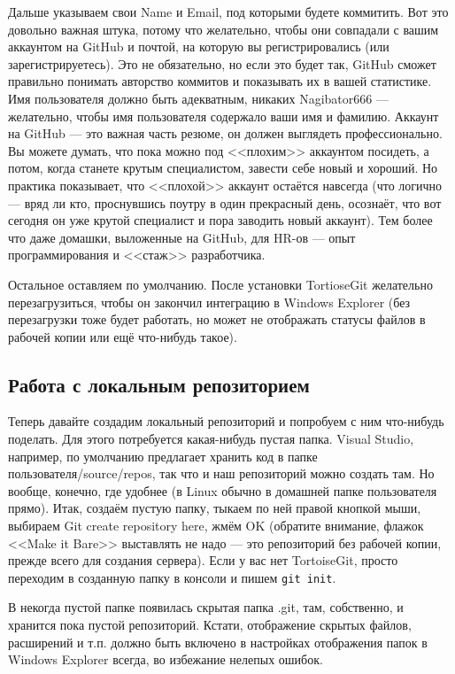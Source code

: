 \documentclass{../text-style}
\begin{document}
Дальше указываем свои Name и Email, под которыми будете коммитить. Вот это довольно важная штука, потому что желательно, чтобы они совпадали с вашим аккаунтом на GitHub и почтой, на которую вы регистрировались (или зарегистрируетесь). Это не обязательно, но если это будет так, GitHub сможет правильно понимать авторство коммитов и показывать их в вашей статистике. Имя пользователя должно быть адекватным, никаких Nagibator666 --- желательно, чтобы имя пользователя содержало ваши имя и фамилию. Аккаунт на GitHub --- это важная часть резюме, он должен выглядеть профессионально. Вы можете думать, что пока можно под <<плохим>> аккаунтом посидеть, а потом, когда станете крутым специалистом, завести себе новый и хороший. Но практика показывает, что <<плохой>> аккаунт остаётся навсегда (что логично --- вряд ли кто, проснувшись поутру в один прекрасный день, осознаёт, что вот сегодня он уже крутой специалист и пора заводить новый аккаунт). Тем более что даже домашки, выложенные на GitHub, для HR-ов --- опыт программирования и <<стаж>> разработчика.

Остальное оставляем по умолчанию. После установки TortioseGit желательно перезагрузиться, чтобы он закончил интеграцию в Windows Explorer (без перезагрузки тоже будет работать, но может не отображать статусы файлов в рабочей копии или ещё что-нибудь такое).

\subsection{Работа с локальным репозиторием}

Теперь давайте создадим локальный репозиторий и попробуем с ним что-нибудь поделать. Для этого потребуется какая-нибудь пустая папка. Visual Studio, например, по умолчанию предлагает хранить код в папке пользователя/source/repos, так что и наш репозиторий можно создать там. Но вообще, конечно, где удобнее (в Linux обычно в домашней папке пользователя прямо). Итак, создаём пустую папку, тыкаем по ней правой кнопкой мыши, выбираем Git create repository here, жмём OK (обратите внимание, флажок <<Make it Bare>> выставлять не надо --- это репозиторий без рабочей копии, прежде всего для создания сервера). Если у вас нет TortoiseGit, просто переходим в созданную папку в консоли и пишем \verb|git init|.

В некогда пустой папке появилась скрытая папка .git, там, собственно, и хранится пока пустой репозиторий. Кстати, отображение скрытых файлов, расширений и т.п. должно быть включено в настройках отображения папок в Windows Explorer всегда, во избежание нелепых ошибок.
\end{document}
